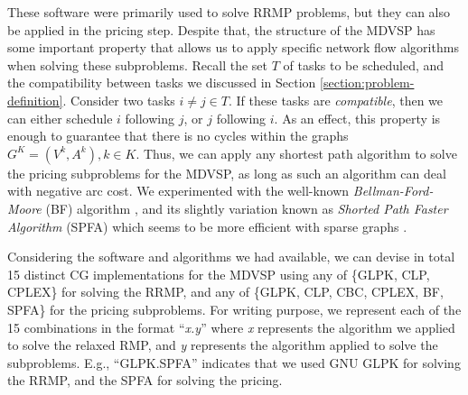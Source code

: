 \documentclass{article}
\begin{document}
These software were primarily used to solve RRMP problems, but they can also be applied in the pricing step. Despite that, the structure of the MDVSP has some important property that allows us to apply specific network flow algorithms when solving these subproblems. Recall the set $T$ of tasks to be scheduled, and the compatibility between tasks we discussed in Section \ref{section:problem-definition}. Consider two tasks $i \neq j \in T$. If these tasks are \textit{compatible}, then we can either schedule $i$ following $j$, or $j$ following $i$. As an effect, this property is enough to guarantee that there is no cycles within the graphs $G^K=(V^k, A^k), k \in K$. Thus, we can apply any shortest path algorithm to solve the pricing subproblems for the MDVSP, as long as such an algorithm can deal with negative arc cost. We experimented with the well-known \textit{Bellman-Ford-Moore} (BF) algorithm \citep{bang2008-bellman-ford-moore}, and its slightly variation known as \textit{Shorted Path Faster Algorithm} (SPFA) which seems to be more efficient with sparse graphs \citep{fanding1994-spfa}.

Considering the software and algorithms we had available, we can devise in total 15 distinct CG implementations for the MDVSP using any of \{GLPK, CLP, CPLEX\} for solving the RRMP, and any of \{GLPK, CLP, CBC, CPLEX, BF, SPFA\} for the pricing subproblems. For writing purpose, we represent each of the 15 combinations in the format ``\textit{x.y}'' where \textit{x} represents the algorithm we applied to solve the relaxed RMP, and \textit{y} represents the algorithm applied to solve the subproblems. E.g., ``GLPK.SPFA'' indicates that we used GNU GLPK for solving the RRMP, and the SPFA for solving the pricing.
\end{document}
